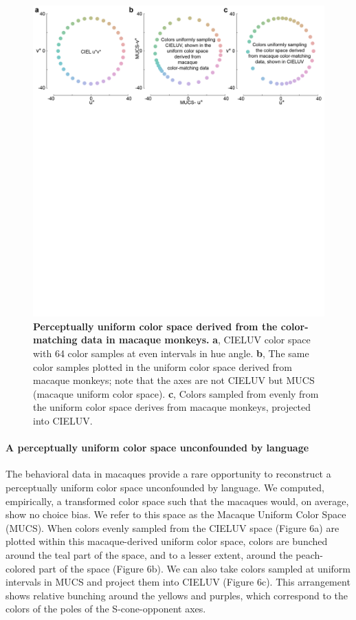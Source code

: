 \begin{figure}
    \begin{fullwidth}
    \centering
      \includegraphics[width=\textwidth+4cm,trim={0 15cm 0 0},clip]{../Figures/flat/F6_ColSpace_2}
           \caption{\textbf{Perceptually uniform color space derived from the color-matching data in macaque monkeys.} 
			\textbf{a}, CIELUV color space with 64 color samples at even intervals in hue angle. 
			\textbf{b}, The same color samples plotted in the uniform color space derived from macaque monkeys; note that the axes are not CIELUV but MUCS (macaque uniform color space). 
			\textbf{c}, Colors sampled from evenly from the uniform color space derives from macaque monkeys, projected into CIELUV.}
		\label{fig:MACBEHcolorspace}
    \end{fullwidth}
\end{figure}


\paragraph{A perceptually uniform color space unconfounded by language}

The behavioral data in macaques provide a rare opportunity to reconstruct a perceptually uniform color space unconfounded by language.
We computed, empirically, a transformed color space such that the macaques would, on average, show no choice bias. 
We refer to this space as the Macaque Uniform Color Space (MUCS). 
When colors evenly sampled from the CIELUV space (Figure 6a) are plotted within this macaque-derived uniform color space, colors are bunched around the teal part of the space, and to a lesser extent, around the peach-colored part of the space (Figure 6b). 
We can also take colors sampled at uniform intervals in MUCS and project them into CIELUV (Figure 6c). This arrangement shows relative bunching around the yellows and purples, which correspond to the colors of the poles of the S-cone-opponent axes. 

